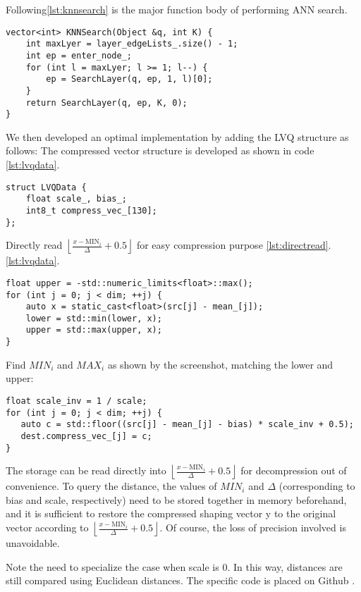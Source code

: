 \documentclass[sigconf, nonacm]{acmart}
\begin{document}
Following\ref{lst:knnsearch} is the major function body of performing ANN search.
\begin{lstlisting}[caption={KNNSearch }, label={lst:knnsearch}]
vector<int> KNNSearch(Object &q, int K) {
    int maxLyer = layer_edgeLists_.size() - 1; 
    int ep = enter_node_; 
    for (int l = maxLyer; l >= 1; l--) {
        ep = SearchLayer(q, ep, 1, l)[0];
    }
    return SearchLayer(q, ep, K, 0);
}
\end{lstlisting}

We then developed an optimal implementation by adding the LVQ structure as follows: The compressed vector structure is developed as shown in code \ref{lst:lvqdata}.
\begin{lstlisting}[caption={LVQData Struct}, label={lst:lvqdata}]
struct LVQData {
    float scale_, bias_;
    int8_t compress_vec_[130];
};
\end{lstlisting}
Directly read $\left\lfloor \frac{x - \text{MIN}_i}{\Delta} + 0.5 \right\rfloor$ for easy compression purpose \ref{lst:directread}.
\ref{lst:lvqdata}.
\begin{lstlisting}[caption={}, label={lst:directread}]
float upper = -std::numeric_limits<float>::max();
for (int j = 0; j < dim; ++j) {
    auto x = static_cast<float>(src[j] - mean_[j]);
    lower = std::min(lower, x);
    upper = std::max(upper, x);
}
\end{lstlisting}
Find $MIN_i$ and $MAX_i$ as shown by the screenshot, matching the lower and upper:
\begin{lstlisting}[caption={}, label={lst:match}]
float scale_inv = 1 / scale;
for (int j = 0; j < dim; ++j) {
   auto c = std::floor((src[j] - mean_[j] - bias) * scale_inv + 0.5);
   dest.compress_vec_[j] = c;
}
\end{lstlisting}
The storage can be read directly into $\left\lfloor \frac{x - \text{MIN}_i}{\Delta} + 0.5 \right\rfloor
$ for decompression out of convenience.
To query the distance, the values of $MIN_i$ and $\Delta$ (corresponding to bias and scale, respectively) need to be stored together in memory beforehand, and it is sufficient to restore the compressed shaping vector y to the original vector according to $\left\lfloor \frac{x - \text{MIN}_i}{\Delta} + 0.5 \right\rfloor$. Of course, the loss of precision involved is unavoidable.

Note the need to specialize the case when scale is 0. In this way, distances are still compared using Euclidean distances. The specific code is placed on Github \cite{mygit}.
\end{document}
